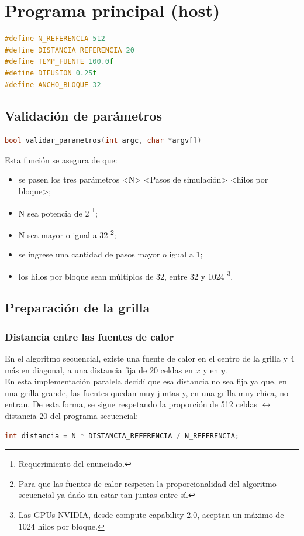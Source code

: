 \section{Programa principal (host)}
\begin{lstlisting}[title={\textit{Macros del programa}}, captionpos=b, language=c, firstnumber=9]
#define N_REFERENCIA 512
#define DISTANCIA_REFERENCIA 20
#define TEMP_FUENTE 100.0f
#define DIFUSION 0.25f
#define ANCHO_BLOQUE 32
\end{lstlisting}

\subsection{Validación de parámetros}
\begin{lstlisting}[language=c, firstnumber=15]
bool validar_parametros(int argc, char *argv[])
\end{lstlisting}
Esta función se asegura de que:
\begin{itemize}
  \item se pasen los tres parámetros <N> <Pasos de simulación> <hilos por bloque>;
  \item N sea potencia de 2 \footnote{Requerimiento del enunciado.};
  \item N sea mayor o igual a 32 \footnote{Para que las fuentes de calor respeten la proporcionalidad del algoritmo secuencial ya dado sin estar tan juntas entre sí.};
  \item se ingrese una cantidad de pasos mayor o igual a 1;
  \item los hilos por bloque sean múltiplos de 32, entre 32 y 1024 \footnote{Las GPUs NVIDIA, desde compute capability 2.0, aceptan un máximo de 1024 hilos por bloque.}.
\end{itemize}
\label{sec:explicacion_ancho_bloque}
\subsection{Preparación de la grilla}
    \subsubsection{Distancia entre las fuentes de calor}
    En el algoritmo secuencial, existe una fuente de calor en el centro de la grilla y 4 más en diagonal, a una distancia fija de 20 celdas en $x$ y en $y$.\\
    En esta implementación paralela decidí que esa distancia no sea fija ya que, en una grilla grande, las fuentes quedan muy juntas y, en una grilla muy chica, no entran.
    De esta forma, se sigue respetando la proporción de 512 celdas $\longleftrightarrow$ distancia 20 del programa secuencial:
\begin{lstlisting}[language=c, firstnumber=161]
int distancia = N * DISTANCIA_REFERENCIA / N_REFERENCIA;
\end{lstlisting}
    
